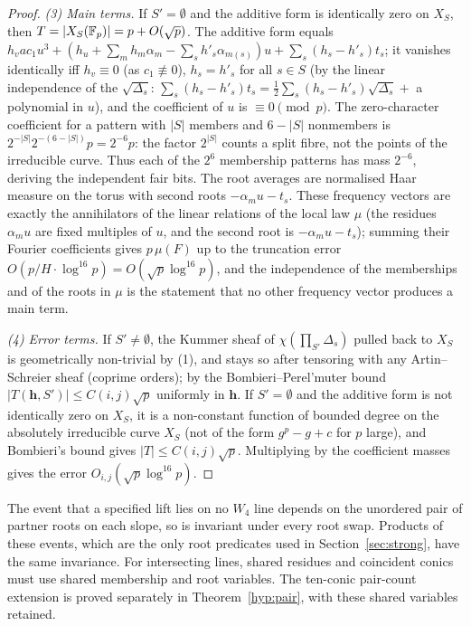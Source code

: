 \begin{proof}
\emph{(3) Main terms.}  If $S'=\emptyset$ and the additive form is identically zero on $X_S$, then $T=|X_S(\mathbb{F}_p)|=p+O(\sqrt p)$.  The additive form
equals $h_vac_1u^3+(h_u+\sum_mh_m\alpha_m-\sum_sh'_s\alpha_{m(s)})u+\sum_s(h_s-h'_s)t_s$; it vanishes identically iff $h_v\equiv0$ (as $c_1\not\equiv0$),
$h_s=h'_s$ for all $s\in S$ (by the linear independence of the $\sqrt{\Delta_s}$: $\sum_s(h_s-h'_s)t_s=\tfrac12\sum_s(h_s-h'_s)\sqrt{\Delta_s}+$ a polynomial in $u$),
and the coefficient of $u$ is $\equiv0\pmod p$.  The zero-character coefficient for a pattern with $|S|$ members and $6-|S|$ nonmembers is
$2^{-|S|}2^{-(6-|S|)}p=2^{-6}p$: the factor $2^{|S|}$ counts a split fibre, not the points of the irreducible curve.
Thus each of the $2^6$ membership patterns has mass $2^{-6}$, deriving the independent fair bits.
The root averages are normalised Haar measure on the torus with second roots $-\alpha_mu-t_s$.
These frequency vectors are exactly the annihilators of the linear relations of the local law $\mu$
(the residues $\alpha_mu$ are fixed multiples of $u$, and the second root is $-\alpha_mu-t_s$); summing their Fourier coefficients gives $p\,\mu(F)$ up to the
truncation error $O(p/H\cdot\log^{16}p)=O(\sqrt p\log^{16}p)$, and the independence of the memberships and of the roots in $\mu$ is the statement that no other
frequency vector produces a main term.

\emph{(4) Error terms.}  If $S'\ne\emptyset$, the Kummer sheaf of $\chi(\prod_{S'}\Delta_s)$ pulled back to $X_S$ is geometrically non-trivial by (1), and stays
so after tensoring with any Artin--Schreier sheaf (coprime orders); by the Bombieri--Perel'muter bound \cite{Perelmuter,CastroMoreno} $|T(\mathbf h,S')|\le
C(i,j)\sqrt p$ uniformly in $\mathbf h$.  If $S'=\emptyset$ and the additive form is not identically zero on $X_S$, it is a non-constant function of bounded degree
on the absolutely irreducible curve $X_S$ (not of the form $g^p-g+c$ for $p$ large), and Bombieri's bound \cite{Bombieri66} gives $|T|\le C(i,j)\sqrt p$.
Multiplying by the coefficient masses gives the error $O_{i,j}(\sqrt p\log^{16}p)$.
\end{proof}
\begin{remark}
The event that a specified lift lies on no $W_4$ line depends on the unordered pair of partner roots on each slope, so is invariant under every root swap.
Products of these events, which are the only root predicates used in Section~\ref{sec:strong}, have the same invariance.
For intersecting lines, shared residues and coincident conics must use shared membership and root variables.
The ten-conic pair-count extension is proved separately in Theorem~\ref{hyp:pair}, with these shared variables retained.
\end{remark}
